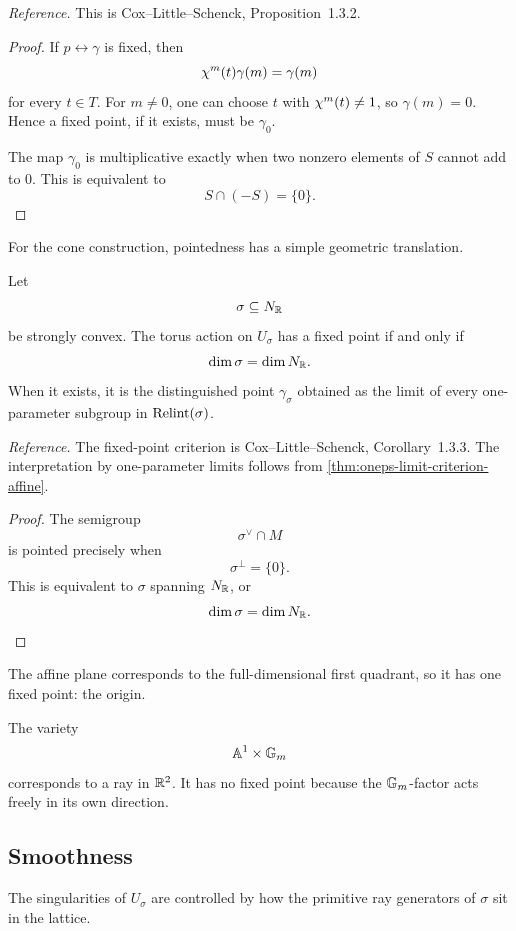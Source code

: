 \noindent
\textit{Reference.}
This is Cox--Little--Schenck, Proposition~1.3.2.

\begin{proof}
If \(p\leftrightarrow\gamma\) is fixed, then
\[
\chi^{m}(t)\gamma(m)=\gamma(m)
\]
for every \(t\in T\). For \(m\neq0\), one can choose \(t\) with
\(\chi^{m}(t)\neq1\), so \(\gamma(m)=0\). Hence a fixed point, if
it exists, must be \(\gamma_0\).

The map \(\gamma_0\) is multiplicative exactly when two nonzero
elements of \(S\) cannot add to \(0\). This is equivalent to
\[
S\cap(-S)=\{0\}.
\]
\end{proof}

For the cone construction, pointedness has a simple geometric
translation.

\begin{corollary}
\label{cor:fixed-point-full-dimensional-cone}
Let
\[
\sigma\subseteq N_{\mathbb{R}}
\]
be strongly convex. The torus action on \(U_\sigma\) has a fixed point
if and only if
\[
\dim\sigma=\dim N_{\mathbb{R}}.
\]
When it exists, it is the distinguished point
\(\gamma_\sigma\) obtained as the limit of every one-parameter
subgroup in \(\operatorname{Relint}(\sigma)\).
\end{corollary}

\noindent
\textit{Reference.}
The fixed-point criterion is Cox--Little--Schenck,
Corollary~1.3.3. The interpretation by one-parameter limits follows
from \cref{thm:oneps-limit-criterion-affine}.

\begin{proof}
The semigroup
\[
\sigma^\vee\cap M
\]
is pointed precisely when
\[
\sigma^\perp=\{0\}.
\]
This is equivalent to \(\sigma\) spanning \(N_{\mathbb{R}}\), or
\[
\dim\sigma=\dim N_{\mathbb{R}}.
\]
\end{proof}

\begin{example}
The affine plane corresponds to the full-dimensional first quadrant,
so it has one fixed point: the origin.

The variety
\[
\mathbb{A}^1\times\mathbb{G}_{m}
\]
corresponds to a ray in \(\mathbb{R}^2\). It has no fixed point because the
\(\mathbb{G}_{m}\)-factor acts freely in its own direction.
\end{example}

\subsection{Smoothness}

The singularities of \(U_\sigma\) are controlled by how the primitive
ray generators of \(\sigma\) sit in the lattice.

